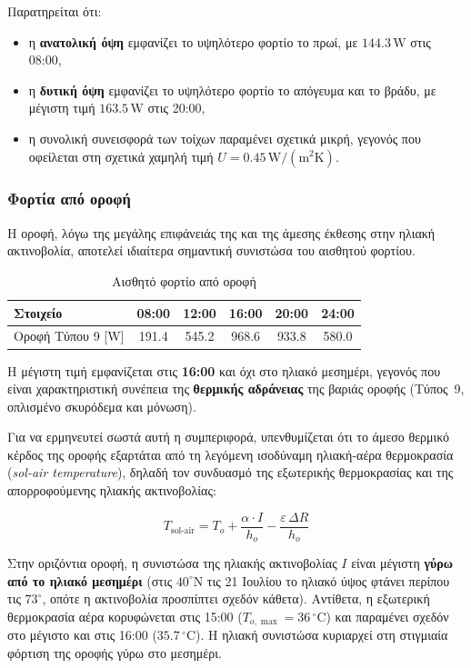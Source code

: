 \documentclass[12pt,a4paper]{article}
\begin{document}
Παρατηρείται ότι:

\begin{itemize}
\item η \textbf{ανατολική όψη} εμφανίζει το υψηλότερο φορτίο το πρωί, με
\(144.3\,\mathrm{W}\) στις 08:00,
\item η \textbf{δυτική όψη} εμφανίζει το υψηλότερο φορτίο το απόγευμα και το βράδυ,
με μέγιστη τιμή \(163.5\,\mathrm{W}\) στις 20:00,
\item η συνολική συνεισφορά των τοίχων παραμένει σχετικά μικρή, γεγονός που
οφείλεται στη σχετικά χαμηλή τιμή \(U = 0.45\,\mathrm{W/(m^2K)}\).
\end{itemize}

\subsubsection{Φορτία από οροφή}

Η οροφή, λόγω της μεγάλης επιφάνειάς της και της άμεσης έκθεσης στην ηλιακή
ακτινοβολία, αποτελεί ιδιαίτερα σημαντική συνιστώσα του αισθητού φορτίου.

\begin{table}[H]
\centering
\caption{Αισθητό φορτίο από οροφή}
\begin{tabular}{lccccc}
\toprule
\textbf{Στοιχείο} & \textbf{08:00} & \textbf{12:00} & \textbf{16:00} & \textbf{20:00} & \textbf{24:00} \\
\midrule
Οροφή Τύπου 9 [W] & 191.4 & 545.2 & 968.6 & 933.8 & 580.0 \\
\bottomrule
\end{tabular}
\end{table}

Η μέγιστη τιμή εμφανίζεται στις \textbf{16:00} και όχι στο ηλιακό μεσημέρι,
γεγονός που είναι χαρακτηριστική συνέπεια της \textbf{θερμικής αδράνειας} της
βαριάς οροφής (Τύπος~9, οπλισμένο σκυρόδεμα και μόνωση).

Για να ερμηνευτεί σωστά αυτή η συμπεριφορά, υπενθυμίζεται ότι το άμεσο θερμικό
κέρδος της οροφής εξαρτάται από τη λεγόμενη ισοδύναμη ηλιακή-αέρα θερμοκρασία
(\textit{sol-air temperature}), δηλαδή τον συνδυασμό της εξωτερικής θερμοκρασίας
και της απορροφούμενης ηλιακής ακτινοβολίας:

\[
T_{\text{sol-air}} = T_o + \frac{\alpha \cdot I}{h_o} - \frac{\varepsilon \, \Delta R}{h_o}
\]

Στην οριζόντια οροφή, η συνιστώσα της ηλιακής ακτινοβολίας \(I\) είναι μέγιστη
\textbf{γύρω από το ηλιακό μεσημέρι} (στις \(40^\circ\mathrm{N}\) τις 21 Ιουλίου
το ηλιακό ύψος φτάνει περίπου τις \(73^\circ\), οπότε η ακτινοβολία προσπίπτει
σχεδόν κάθετα). Αντίθετα, η εξωτερική θερμοκρασία αέρα κορυφώνεται στις 15:00
(\(T_{o,\max} = 36\,^\circ\mathrm{C}\)) και παραμένει σχεδόν στο μέγιστο και
στις 16:00 (\(35.7\,^\circ\mathrm{C}\)). Η ηλιακή συνιστώσα κυριαρχεί στη
στιγμιαία φόρτιση της οροφής γύρω στο μεσημέρι.
\end{document}
